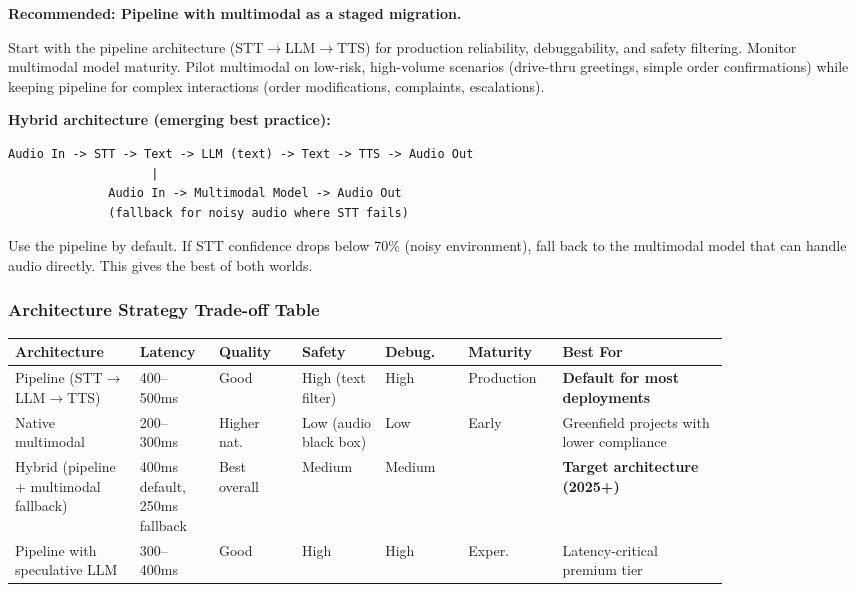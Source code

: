 \bigskip
\textbf{Recommended: Pipeline with multimodal as a staged migration.}

Start with the pipeline architecture (STT$\rightarrow$LLM$\rightarrow$TTS) for production reliability, debuggability, and safety filtering. Monitor multimodal model maturity. Pilot multimodal on low-risk, high-volume scenarios (drive-thru greetings, simple order confirmations) while keeping pipeline for complex interactions (order modifications, complaints, escalations).

\textbf{Hybrid architecture (emerging best practice):}

\begin{verbatim}
Audio In -> STT -> Text -> LLM (text) -> Text -> TTS -> Audio Out
                    |
              Audio In -> Multimodal Model -> Audio Out
              (fallback for noisy audio where STT fails)
\end{verbatim}

Use the pipeline by default. If STT confidence drops below 70\% (noisy environment), fall back to the multimodal model that can handle audio directly. This gives the best of both worlds.

\subsubsection*{Architecture Strategy Trade-off Table}

{\small
\begin{tabular}{|p{0.15\linewidth}|p{0.08\linewidth}|p{0.1\linewidth}|p{0.1\linewidth}|p{0.1\linewidth}|p{0.1\linewidth}|p{0.2\linewidth}|}
\hline
\textbf{Architecture} & \textbf{Latency} & \textbf{Quality} & \textbf{Safety} & \textbf{Debug.} & \textbf{Maturity} & \textbf{Best For} \\
\hline
Pipeline (STT$\rightarrow$LLM$\rightarrow$TTS) & 400--500ms & Good & High (text filter) & High & Production & \textbf{Default for most deployments} \\
\hline
Native multimodal & 200--300ms & Higher nat. & Low (audio black box) & Low & Early & Greenfield projects with lower compliance \\
\hline
Hybrid (pipeline + multimodal fallback) & 400ms default, 250ms fallback & Best overall & Medium & Medium & & \textbf{Target architecture (2025+)} \\
\hline
Pipeline with speculative LLM & 300--400ms & Good & High & High & Exper. & Latency-critical premium tier \\
\hline
\end{tabular}
}


